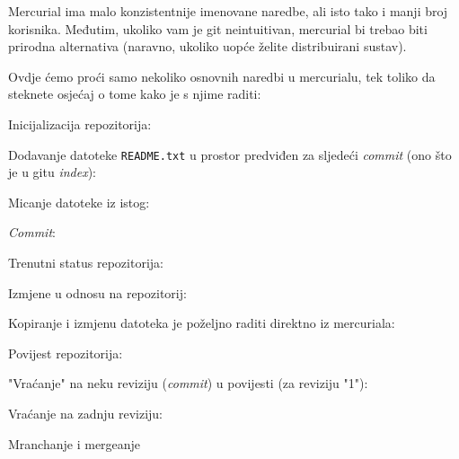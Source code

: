 Mercurial ima malo konzistentnije imenovane naredbe, ali isto tako i manji broj korisnika.
Međutim, ukoliko vam je git neintuitivan, mercurial bi trebao biti prirodna alternativa (naravno, ukoliko uopće želite distribuirani sustav).

Ovdje ćemo proći samo nekoliko osnovnih naredbi u mercurialu, tek toliko da steknete osjećaj o tome kako je s njime raditi:

Inicijalizacija repozitorija:


Dodavanje datoteke \verb+README.txt+ u prostor predviđen za sljedeći \emph{commit} (ono što je u gitu \emph{index}):


Micanje datoteke iz istog:


\emph{Commit}:


Trenutni status repozitorija:


Izmjene u odnosu na repozitorij:


Kopiranje i izmjenu datoteka je poželjno raditi direktno iz mercuriala:


Povijest repozitorija:


"Vraćanje" na neku reviziju (\emph{commit}) u povijesti (za reviziju "1"):


Vraćanje na zadnju reviziju:


\TODO Mranchanje i mergeanje

